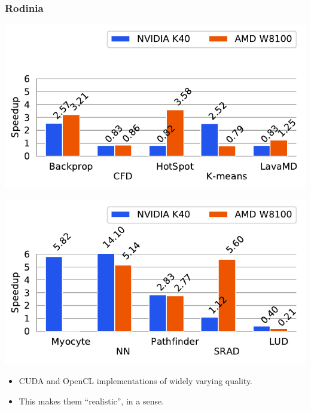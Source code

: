 \documentclass[rgb,dvipsnames]{beamer}
\begin{document}
\begin{frame}
  \frametitle{Rodinia}

  \begin{minipage}{0.6\linewidth}
    \includegraphics[scale=0.6]{img/rodinia1.pdf}

    \includegraphics[scale=0.6]{img/rodinia2.pdf}
  \end{minipage}
  \begin{minipage}{0.39\linewidth}
    \begin{itemize}
    \item CUDA and OpenCL implementations of widely varying quality.
    \item This makes them ``realistic'', in a sense.
    \end{itemize}
  \end{minipage}
\end{frame}
\end{document}

